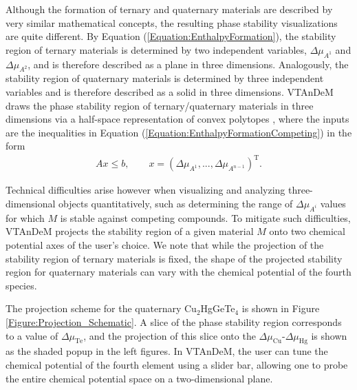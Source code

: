 \documentclass[%
 reprint,
 amsmath,amssymb,
 aps,
]{revtex4-1}
\begin{document}
Although the formation of ternary and quaternary materials are described by very similar mathematical concepts, the resulting phase stability visualizations are quite different. By Equation (\ref{Equation:EnthalpyFormation}), the stability region of ternary materials is determined by two independent variables, $\Delta \mu_{A^1}$ and $\Delta \mu_{A^2}$, and is therefore described as a plane in three dimensions. Analogously, the stability region of quaternary materials is determined by three independent variables and is therefore described as a solid in three dimensions. VTAnDeM draws the phase stability region of ternary/quaternary materials in three dimensions via a half-space representation of convex polytopes \cite{PyPolyhedron1, PyPolyhedron2}, where the inputs are the inequalities in Equation (\ref{Equation:EnthalpyFormationCompeting}) in the form
\begin{equation}
\begin{aligned}
A x \leq b, \qquad x = (\Delta \mu_{A^1}, ..., \Delta \mu_{A^{n-1}})^{\text{T}}.
\end{aligned}
\label{Equation:HRepresentation}
\end{equation}

Technical difficulties arise however when visualizing and analyzing three-dimensional objects quantitatively, such as determining the range of $\Delta \mu_{A^i}$ values for which $M$ is stable against competing compounds. To mitigate such difficulties, VTAnDeM projects the stability region of a given material $M$ onto two chemical potential axes of the user's choice. We note that while the projection of the stability region of ternary materials is fixed, the shape of the projected stability region for quaternary materials can vary with the chemical potential of the fourth species.

The projection scheme for the quaternary Cu$_2$HgGeTe$_4$ is shown in Figure \ref{Figure:Projection_Schematic}. A slice of the phase stability region corresponds to a value of $\Delta \mu_{\text{Te}}$, and the projection of this slice onto the $\Delta \mu_{\text{Cu}}$-$\Delta \mu_{\text{Hg}}$ is shown as the shaded popup in the left figures. In VTAnDeM, the user can tune the chemical potential of the fourth element using a slider bar, allowing one to probe the entire chemical potential space on a two-dimensional plane.
\end{document}
